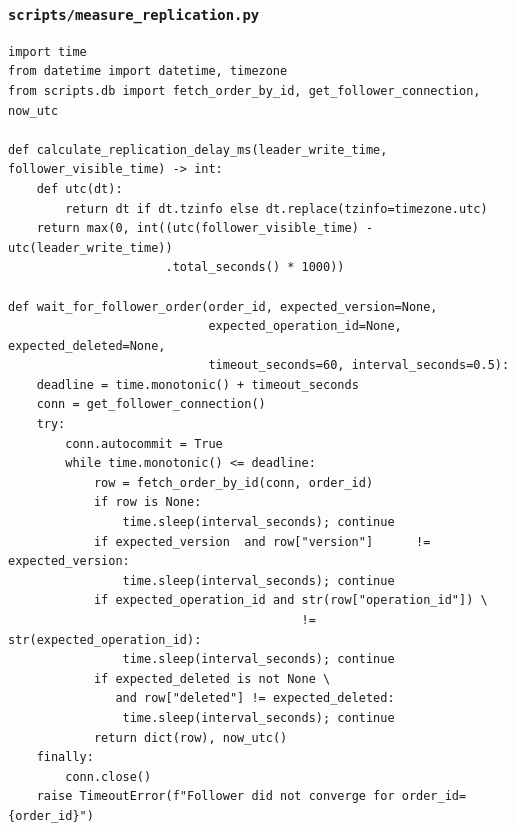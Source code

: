 \documentclass[12pt,a4paper]{article}
\begin{document}
\subsubsection{\texttt{scripts/measure\_replication.py}}
\begin{lstlisting}[style=pythonstyle]
import time
from datetime import datetime, timezone
from scripts.db import fetch_order_by_id, get_follower_connection, now_utc

def calculate_replication_delay_ms(leader_write_time, follower_visible_time) -> int:
    def utc(dt):
        return dt if dt.tzinfo else dt.replace(tzinfo=timezone.utc)
    return max(0, int((utc(follower_visible_time) - utc(leader_write_time))
                      .total_seconds() * 1000))

def wait_for_follower_order(order_id, expected_version=None,
                            expected_operation_id=None, expected_deleted=None,
                            timeout_seconds=60, interval_seconds=0.5):
    deadline = time.monotonic() + timeout_seconds
    conn = get_follower_connection()
    try:
        conn.autocommit = True
        while time.monotonic() <= deadline:
            row = fetch_order_by_id(conn, order_id)
            if row is None:
                time.sleep(interval_seconds); continue
            if expected_version  and row["version"]      != expected_version:
                time.sleep(interval_seconds); continue
            if expected_operation_id and str(row["operation_id"]) \
                                         != str(expected_operation_id):
                time.sleep(interval_seconds); continue
            if expected_deleted is not None \
               and row["deleted"] != expected_deleted:
                time.sleep(interval_seconds); continue
            return dict(row), now_utc()
    finally:
        conn.close()
    raise TimeoutError(f"Follower did not converge for order_id={order_id}")
\end{lstlisting}
\end{document}
